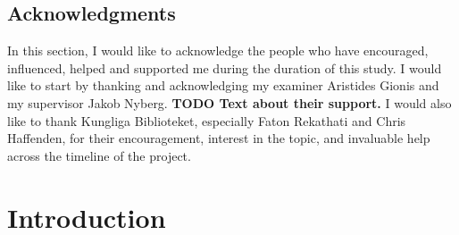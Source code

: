 \documentclass[oneside, english, bibtex]{kththesis}
\begin{document}
\cleardoublepage

\section*{Acknowledgments }

In this section, I would like to acknowledge the people who have encouraged, influenced, helped and supported me during the duration of this study.
    I would like to start by thanking and acknowledging my examiner Aristides Gionis and my supervisor Jakob Nyberg. \textbf{TODO Text about their support.} I would also like to thank Kungliga Biblioteket, especially Faton Rekathati and Chris Haffenden, for their encouragement, interest in the topic, and invaluable help across the timeline of the project.

\acknowlegmentssignature

\renewcommand{\chaptermark}[1]{ \markboth{#1}{}}
\tableofcontents
  \markboth{\contentsname}{}

\cleardoublepage
\listoffigures

\cleardoublepage

\listoftables
\cleardoublepage
\glsaddall
\printglossary[type=\acronymtype, title={List of acronyms and abbreviations}]
\label{pg:lastPageofPreface}
\mainmatter
\glsresetall
\renewcommand{\chaptermark}[1]{\markboth{#1}{}}
\chapter{Introduction}
\label{ch:introduction}
\end{document}
